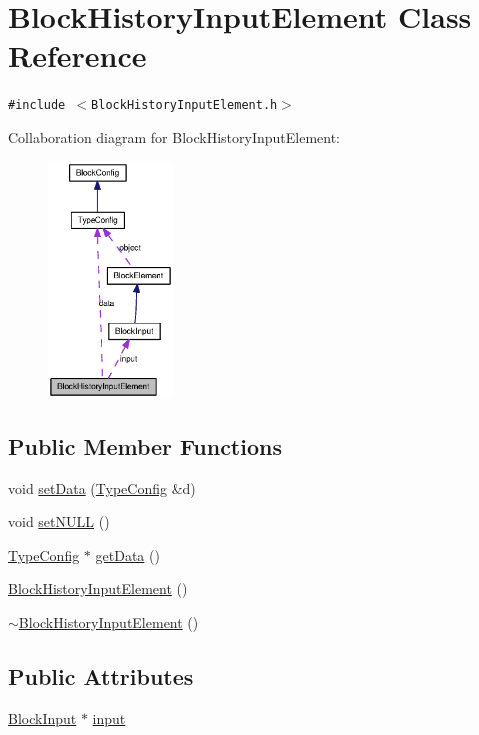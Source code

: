 \hypertarget{classBlockHistoryInputElement}{
\section{BlockHistoryInputElement Class Reference}
\label{classBlockHistoryInputElement}
}
{\tt \#include $<$BlockHistoryInputElement.h$>$}

Collaboration diagram for BlockHistoryInputElement:\nopagebreak
\begin{figure}[H]
\begin{center}
\leavevmode
\includegraphics[width=94pt]{classBlockHistoryInputElement__coll__graph}
\end{center}
\end{figure}
\subsection*{Public Member Functions}
\begin{CompactItemize}
\item 
void \hyperlink{classBlockHistoryInputElement_4a8ebf161f64bbb97cf8b694cd6a72bf}{setData} (\hyperlink{classTypeConfig}{TypeConfig} \&d)
\item 
void \hyperlink{classBlockHistoryInputElement_a3c4c677fcb9c0dbb8f3e31314627ca1}{setNULL} ()
\item 
\hyperlink{classTypeConfig}{TypeConfig} $\ast$ \hyperlink{classBlockHistoryInputElement_d980299844b1b410df13ef28502c73fd}{getData} ()
\item 
\hyperlink{classBlockHistoryInputElement_40ce1d8e1e4f6e7654e31e7dff51bb42}{BlockHistoryInputElement} ()
\item 
\hyperlink{classBlockHistoryInputElement_122c02aac40c5b3e7ff7935e68f36469}{$\sim$BlockHistoryInputElement} ()
\end{CompactItemize}
\subsection*{Public Attributes}
\begin{CompactItemize}
\item 
\hyperlink{classBlockInput}{BlockInput} $\ast$ \hyperlink{classBlockHistoryInputElement_5a307d34d5e47b9baf161c7069415c93}{input}
\end{CompactItemize}
